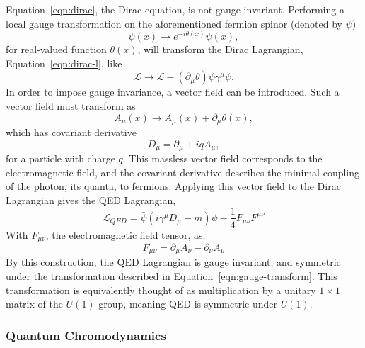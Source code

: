         Equation~\ref{eqn:dirac}, the Dirac equation, is not gauge invariant. Performing a local gauge transformation on the aforementioned fermion spinor (denoted by $\psi$)
        \begin{equation}\label{eqn:gauge-transform}
            \psi(x) \rightarrow e^{-i\theta(x)}\psi(x),
        \end{equation}        
        for real-valued function $\theta(x)$, will transform the Dirac Lagrangian, Equation~\ref{eqn:dirac-l}, like
        \begin{equation}
            \mathcal{L} \rightarrow \mathcal{L} - (\partial_{\mu}\theta)\bar{\psi}\gamma^{\mu}\psi.
        \end{equation}
        In order to impose gauge invariance, a vector field can be introduced. Such a vector field must transform as
        \begin{equation}
            A_{\mu}(x) \rightarrow A_{\mu}(x) + \partial_{\mu}\theta(x),
        \end{equation}
        which has covariant derivative
        \begin{equation}
            D_{\mu} = \partial_{\mu} + iqA_{\mu},
        \end{equation}
        for a particle with charge $q$. This massless vector field corresponds to the electromagnetic field, and the covariant derivative describes the minimal coupling of the photon, its quanta, to fermions. Applying this vector field to the Dirac Lagrangian gives the \gls{QED} Lagrangian,
        \begin{equation}\label{eqn:qed-lagrangian}
            \mathcal{L}_{QED} = \bar{\psi} (i \gamma^{\mu} D_{\mu} - m)\psi - \frac{1}{4} F_{\mu \nu}F^{\mu \nu}
        \end{equation}
        With $F_{\mu \nu}$, the electromagnetic field tensor, as:
        \begin{equation}\label{eqn:em-field-tensor}
        F_{\mu \nu} = \partial_{\mu}A_{\nu} - \partial_{\nu}A_{\mu}
        \end{equation}
        By this construction, the \gls{QED} Lagrangian is gauge invariant, and symmetric under the transformation described in Equation~\ref{eqn:gauge-transform}. This transformation is equivalently thought of as multiplication by a unitary $1 \times 1$ matrix of the $U(1)$ group, meaning \gls{QED} is symmetric under $U(1)$.


        \subsubsection{Quantum Chromodynamics}\label{sssec:QCD}

